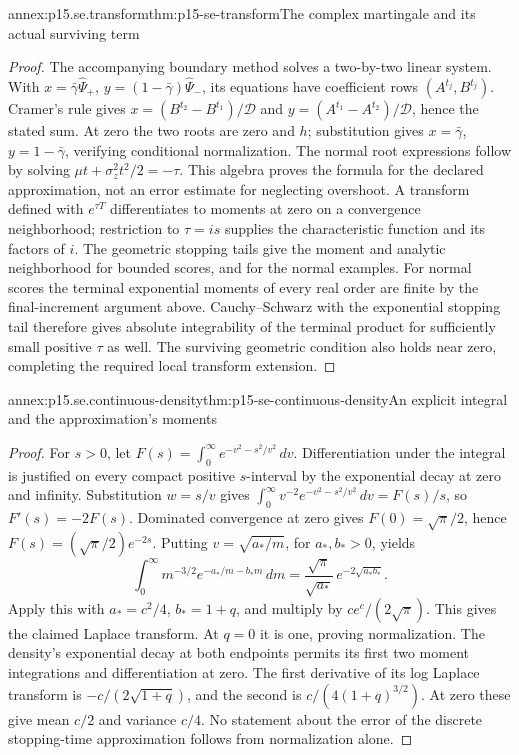 \begin{annexitem}{annex:p15.se.transform}{thm:p15-se-transform}{The complex martingale and its actual surviving term}
\begin{proof}
The accompanying boundary method solves a two-by-two linear system.
With \(x=\bar\gamma\widehat\Psi_+\),
\(y=(1-\bar\gamma)\widehat\Psi_-\), its equations have coefficient
rows \((A^{t_j},B^{t_j})\). Cramer's rule gives
\(x=(B^{t_2}-B^{t_1})/\mathcal D\) and
\(y=(A^{t_1}-A^{t_2})/\mathcal D\), hence the stated sum.
At zero the two roots are zero and \(h\); substitution gives
\(x=\bar\gamma\), \(y=1-\bar\gamma\), verifying conditional
normalization. The normal root expressions follow by solving
\(\mu t+\sigma_z^2t^2/2=-\tau\). This algebra proves the formula
for the declared approximation, not an error estimate for neglecting
overshoot. A transform defined with \(e^{\tau T}\) differentiates
to moments at zero on a convergence neighborhood; restriction to
\(\tau=is\) supplies the characteristic function and its factors of
\(i\). The geometric stopping tails give the moment and analytic
neighborhood for bounded scores, and for the normal examples.
For normal scores the terminal exponential moments of every real order
are finite by the final-increment argument above. Cauchy--Schwarz with
the exponential stopping tail therefore gives absolute integrability
of the terminal product for sufficiently small positive \(\tau\) as
well. The surviving geometric condition also holds near zero, completing
the required local transform extension.
\end{proof}
\end{annexitem}

\begin{annexitem}{annex:p15.se.continuous-density}{thm:p15-se-continuous-density}{An explicit integral and the approximation's moments}
\begin{proof}
For \(s>0\), let
\(F(s)=\int_0^\infty e^{-v^2-s^2/v^2}\,dv\).
Differentiation under the integral is justified on every compact
positive \(s\)-interval by the exponential decay at zero and infinity.
Substitution \(w=s/v\) gives
\(\int_0^\infty v^{-2}e^{-v^2-s^2/v^2}\,dv=F(s)/s\),
so \(F'(s)=-2F(s)\). Dominated convergence at zero gives
\(F(0)=\sqrt\pi/2\), hence \(F(s)=(\sqrt\pi/2)e^{-2s}\).
Putting \(v=\sqrt{a_*/m}\), for \(a_*,b_*>0\), yields
\[
 \int_0^\infty m^{-3/2}e^{-a_*/m-b_*m}\,dm
          =\frac{\sqrt\pi}{\sqrt{a_*}}\,e^{-2\sqrt{a_*b_*}}.
\]
Apply this with \(a_*=c^2/4\), \(b_*=1+q\), and multiply by
\(ce^c/(2\sqrt\pi)\). This gives the claimed Laplace transform.
At \(q=0\) it is one, proving normalization. The density's exponential
decay at both endpoints permits its first two moment integrations and
differentiation at zero. The first derivative of its log Laplace transform
is \(-c/(2\sqrt{1+q})\), and the second is
\(c/(4(1+q)^{3/2})\). At zero these give mean \(c/2\) and
variance \(c/4\). No statement about the error of the discrete
stopping-time approximation follows from normalization alone.
\end{proof}
\end{annexitem}

